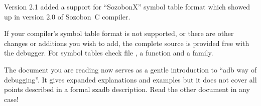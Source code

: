 Version 2.1 added a support for ``SozobonX'' symbol table
format which showed up in version 2.0 of Sozobon~C compiler.

If your compiler's symbol table format is not supported, or there are 
other changes
or additions you wish to add, the complete source is provided free
with the debugger.  For symbol tables check file ,
a function  and a family.

The document you are reading now serves as a gentle introduction to 
``adb way of debugging''.  It gives expanded explanations and
examples but it does not cover all points described
in a formal szadb description.  Read the other document in any case!





\clearpage
{}
\tableofcontents

